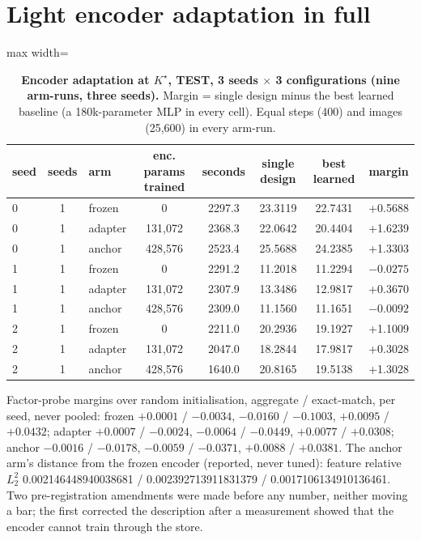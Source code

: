 \documentclass{article} %
\newcommand{\Kstar}{\ensuremath{K^{\star}}}
\begin{document}
\section{Light encoder adaptation in full}
\label{app:adapt}

\begin{table}[h]
\centering\small
\caption{\textbf{Encoder adaptation at $\Kstar$, TEST, 3 seeds $\times$ 3 configurations (nine
arm-runs, three seeds).} Margin = single design minus the best learned baseline (a 180k-parameter %
MLP in every cell). Equal steps (400) and images (25,600) in every arm-run.} %
\label{tab:adapt}
\setlength{\tabcolsep}{3pt}
\begin{adjustbox}{max width=\linewidth}\begin{tabular}{lclccccc}
\toprule
seed & seeds & arm & enc. params trained & seconds & single design & best learned & margin \\
\midrule
0 & 1 & frozen & 0 & 2297.3 & 23.3119 & 22.7431 & +0.5688 \\
0 & 1 & adapter & 131,072 & 2368.3 & 22.0642 & 20.4404 & +1.6239 \\
0 & 1 & anchor & 428,576 & 2523.4 & 25.5688 & 24.2385 & +1.3303 \\
1 & 1 & frozen & 0 & 2291.2 & 11.2018 & 11.2294 & $-0.0275$ \\
1 & 1 & adapter & 131,072 & 2307.9 & 13.3486 & 12.9817 & +0.3670 \\
1 & 1 & anchor & 428,576 & 2309.0 & 11.1560 & 11.1651 & $-0.0092$ \\
2 & 1 & frozen & 0 & 2211.0 & 20.2936 & 19.1927 & +1.1009 \\
2 & 1 & adapter & 131,072 & 2047.0 & 18.2844 & 17.9817 & +0.3028 \\
2 & 1 & anchor & 428,576 & 1640.0 & 20.8165 & 19.5138 & +1.3028 \\
\bottomrule
\end{tabular}\end{adjustbox}
\end{table}

\noindent Factor-probe margins over random initialisation, aggregate / exact-match, per seed, never
pooled: frozen $+0.0001$ / $-0.0034$, $-0.0160$ / $-0.1003$, $+0.0095$ / $+0.0432$; adapter
$+0.0007$ / $-0.0024$, $-0.0064$ / $-0.0449$, $+0.0077$ / $+0.0308$; anchor $-0.0016$ / $-0.0178$,
$-0.0059$ / $-0.0371$, $+0.0088$ / $+0.0381$. The anchor arm's distance from the frozen encoder
(reported, never tuned): feature relative $L_2^2$ 0.002146448940038681 / 0.002392713911831379 /
0.0017106134910136461. %
Two pre-registration amendments were made before any number, neither moving a bar; the first
corrected the description after a measurement showed that the encoder cannot train through the
store. %
\end{document}

